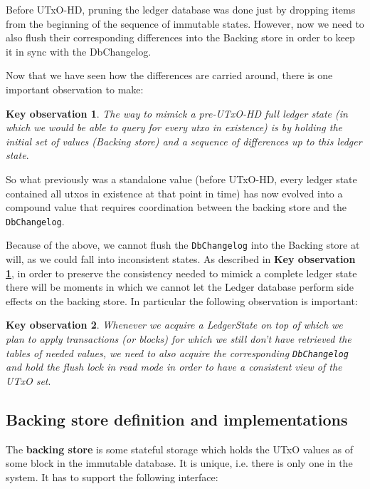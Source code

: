 \documentclass[11pt,a4paper]{article}
\newcommand{\htt}[1]{\texttt{#1}}
\theoremstyle{definition}
\newtheorem{observation}{Key observation}
\begin{document}
Before UTxO-HD, pruning the ledger database was done just by dropping items from
the beginning of the sequence of immutable states. However, now we need to also
flush their corresponding differences into the Backing store in order to keep
it in sync with the DbChangelog.

Now that we have seen how the differences are carried around, there is one important observation to make:

\begin{observation}
  \label{ko1}
  \emph{The way to mimick a pre-UTxO-HD full ledger state (in which we would be
    able to query for every utxo in existence) is by holding the initial set of
    values (Backing store) and a sequence of differences up to this ledger
    state}.
\end{observation}

So what previously was a standalone value (before UTxO-HD, every ledger state
contained all utxos in existence at that point in time) has now evolved into a
compound value that requires coordination between the backing store and the
\htt{DbChangelog}.

Because of the above, we cannot flush the \htt{DbChangelog} into the Backing
store at will, as we could fall into inconsistent states. As described in
\textbf{Key observation \ref{ko1}}, in order to preserve the consistency needed
to mimick a complete ledger state there will be moments in which we cannot let
the Ledger database perform side effects on the backing store. In particular the
following observation is important:

\begin{observation}
  \label{ko2}
  \emph{Whenever we acquire a LedgerState on top of which we plan to apply
    transactions (or blocks) for which we still don't have retrieved the tables
    of needed values, we need to also acquire the corresponding \htt{DbChangelog} and
    hold the flush lock in read mode in order to have a consistent view of the
    UTxO set}.
\end{observation}

\subsection{Backing store definition and implementations}

The \textbf{backing store} is some stateful storage which holds the UTxO values
as of some block in the immutable database. It is unique, i.e. there is only one
in the system. It has to support the following interface:
\end{document}
